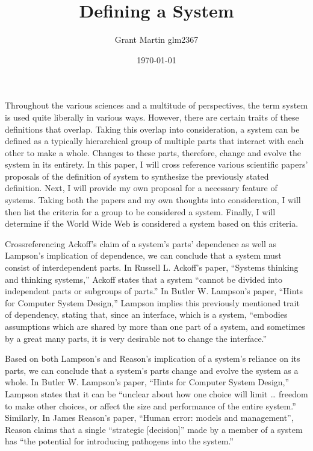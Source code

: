\documentclass[11pt]{article}
\title{Defining a System}
\author{Grant Martin glm2367}
\date{\today}
\begin{document}
\maketitle

Throughout the various sciences and a multitude of perspectives, the term system is used quite liberally in various ways. However, there are certain traits of these definitions that overlap. Taking this overlap into consideration, a system can be defined as a typically hierarchical group of multiple parts that interact with each other to make a whole. Changes to these parts, therefore, change and evolve the system in its entirety. In this paper, I will cross reference various scientific papers' proposals of the definition of system to synthesize the previously stated definition. Next, I will provide my own proposal for a necessary feature of systems. Taking both the papers and my own thoughts into consideration, I will then list the criteria for a group to be considered a system. Finally, I will determine if the World Wide Web is considered a system based on this criteria.
\par Crossreferencing Ackoff's claim of a system's parts' dependence as well as Lampson's implication of dependence, we can conclude that a system must consist of interdependent parts. In Russell  L.  Ackoff's paper, ``Systems thinking and thinking systems,'' Ackoff states that a system ``cannot be divided  into  independent  parts  or subgroups  of parts.''\cite{ackoff:1994} In Butler W. Lampson's paper, ``Hints for Computer System Design,'' Lampson implies this previously mentioned trait of dependency, stating that, since an interface, which is a system, ``embodies assumptions which are shared by more than one part of a system, and sometimes by a great many parts, it is very desirable not to change the interface.''\cite{lampson:1983} 
\par Based on both Lampson's and Reason's implication of a system's reliance on its parts, we can conclude that a system's parts change and evolve the system as a whole. In Butler W. Lampson's paper, ``Hints for Computer System Design,'' Lampson states that it can be ``unclear about how one choice will limit … freedom to make other choices, or affect the size and performance of the entire system.''\cite{lampson:1983} Similarly, In James  Reason's paper, ``Human error: models and management'', Reason claims that a single ``strategic [decision]'' made by a member of a system has ``the potential   for   introducing   pathogens   into   the system.''\cite{reason:2000}
\end{document}

